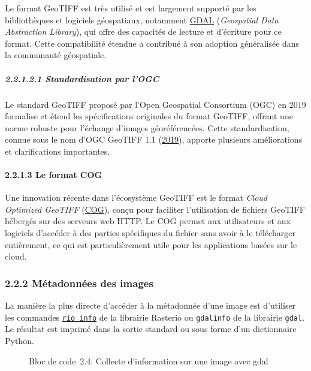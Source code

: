 Le format GeoTIFF est très utilisé et est largement supporté par les
bibliothèques et logiciels géospatiaux, notamment
\href{https://gdal.org}{GDAL} (\emph{Geospatial Data Abstraction
Library}), qui offre des capacités de lecture et d'écriture pour ce
format. Cette compatibilité étendue a contribué à son adoption
généralisée dans la communauté géospatiale.

\subparagraph{\texorpdfstring{{2.2.1.2.1} Standardisation par
l'OGC}{2.2.1.2.1 Standardisation par l'OGC}}\label{standardisation-par-logc}

Le standard GeoTIFF proposé par l'Open Geospatial Consortium (OGC) en
2019 formalise et étend les spécifications originales du format GeoTIFF,
offrant une norme robuste pour l'échange d'images géoréférencées. Cette
standardisation, connue sous le nom d'OGC GeoTIFF 1.1
{(\href{references.html\#ref-OGCGeoTIFF}{2019})}, apporte plusieurs
améliorations et clarifications importantes.

\paragraph{\texorpdfstring{{2.2.1.3} Le format
COG}{2.2.1.3 Le format COG}}\label{le-format-cog}

Une innovation récente dans l'écosystème GeoTIFF est le format
\emph{Cloud Optimized GeoTIFF} (\href{http://cogeo.org/}{COG}), conçu
pour faciliter l'utilisation de fichiers GeoTIFF hébergés sur des
serveurs web HTTP. Le COG permet aux utilisateurs et aux logiciels
d'accéder à des parties spécifiques du fichier sans avoir à le
télécharger entièrement, ce qui est particulièrement utile pour les
applications basées sur le cloud.

\subsubsection{\texorpdfstring{{2.2.2} Métadonnées des
images}{2.2.2 Métadonnées des images}}\label{muxe9tadonnuxe9es-des-images}

La manière la plus directe d'accéder à la métadonnée d'une image est
d'utiliser les commandes
\href{https://rasterio.readthedocs.io/en/stable/cli.html\#info}{\texttt{rio\ info}}
de la librairie Rasterio ou \texttt{gdalinfo} de la librairie
\texttt{gdal}. Le résultat est imprimé dans la sortie standard ou sous
forme d'un dictionnaire Python.

\label{c4af2be1}
\label{lst-gdalinfo}
\begin{figure}
\centering
{}\label{lst-gdalinfo}
\begin{Shaded}
\begin{Highlighting}[]
\OperatorTok{!}
\end{Highlighting}
\end{Shaded}
\caption{Bloc de code~2.4: Collecte d'information sur une image avec
gdal}
\end{figure}

